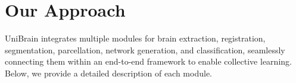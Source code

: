 \vspace{-5pt}
\section{Our Approach}
\label{sec:method}

UniBrain integrates multiple modules for brain extraction, registration, segmentation, parcellation, network generation, and classification, seamlessly connecting them within an end-to-end framework to enable collective learning.
Below, we provide a detailed description of each module.


%


